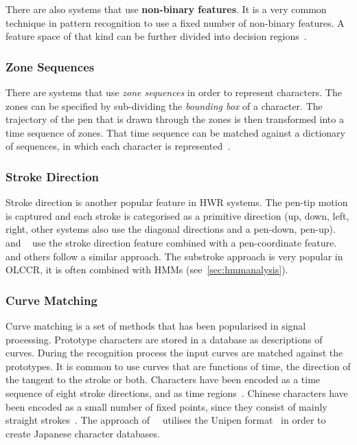 There are also systems that use \textbf{non-binary features}. It is a very common
technique in pattern recognition to use a fixed number of non-binary features.
A feature space of that kind can be further divided into decision 
regions~.

\subsubsection{Zone Sequences}
\label{sec:zonesequences}

There are systems that use \emph{zone sequences} in order to 
represent characters. The zones can be specified by sub-dividing the
\emph{bounding box} of a character. The trajectory of the pen that is drawn 
through the zones is then transformed into a time sequence of zones. 
That time sequence can be matched against a dictionary of sequences, 
in which each character is represented~.

\subsubsection{Stroke Direction}
\label{sec:strokedirection}
Stroke direction is another popular feature in HWR systems. The pen-tip motion
is captured and each stroke is categorised as a primitive direction (up, down, 
left, right, other systems also use the diagonal directions and a pen-down, 
pen-up). ~\citeyear{Nakai2001} and 
~\citeyear{Tokuno2002} use the stroke 
direction feature combined with a pen-coordinate feature. 
~\citeyear{Okumura2005} and others follow 
a similar approach. The substroke approach is very popular in OLCCR, 
it is often combined with HMMs (see~\ref{sec:hmmanalysis}).

\subsubsection{Curve Matching}
\label{sec:curvematching}

Curve matching is a set of methods that has been popularised in signal 
processing. Prototype characters are stored in a database as descriptions 
of curves. During the recognition process the input curves are matched against 
the prototypes. It is common to use curves that are functions of time, 
the direction of the tangent to the stroke or both. Characters have been 
encoded as a time sequence of eight stroke directions, and as time 
regions~. Chinese characters have been encoded as a 
small number of fixed points, since they consist of mainly straight 
strokes~. The approach 
of~~\citeyear{Jaeger2001a} utilises the Unipen 
format~ in order to create Japanese character 
databases.

